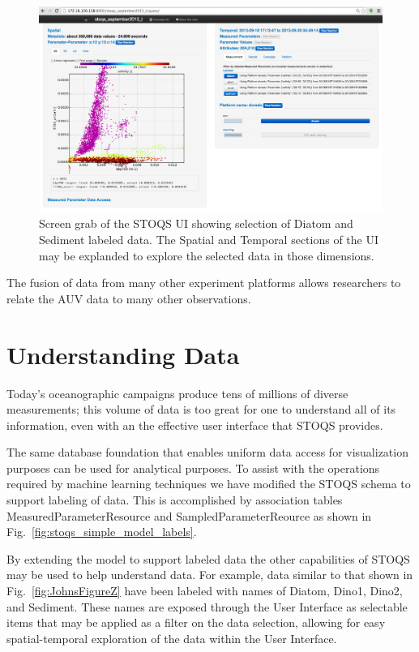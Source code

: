 \documentclass[conference]{IEEEtran}
\begin{document}
\begin{figure}[htbp]
\centering
\includegraphics[width=6.6in]{LabeledSelectionUI.png}
\caption{Screen grab of the STOQS UI showing selection of Diatom and Sediment labeled data. The Spatial and Temporal sections of the UI may be explanded to explore the selected data in those dimensions.}
\label{fig:LabeledSelectionUI}
\end{figure}

The fusion of data from many other experiment platforms allows researchers to relate the AUV data to many other observations.

\section{Understanding Data}

Today's oceanographic campaigns produce tens of millions of diverse measurements; this volume of data is too great for one to understand all of its information, even with an the effective user interface that STOQS provides.

The same database foundation that enables uniform data access for visualization purposes can be used for analytical purposes. To assist with the operations required by machine learning techniques we have modified the STOQS schema to support labeling of data. This is accomplished by association tables MeasuredParameterResource and SampledParameterReource as shown in Fig.~\ref{fig:stoqs_simple_model_labels}.

By extending the model to support labeled data the other capabilities of STOQS may be used to help understand data. For example, data similar to that shown in Fig.~\ref{fig:JohnsFigureZ} have been labeled with names of Diatom, Dino1, Dino2, and Sediment. These names are exposed through the User Interface as selectable items that may be applied as a filter on the data selection, allowing for easy spatial-temporal exploration of the data within the User Interface.
\end{document}
